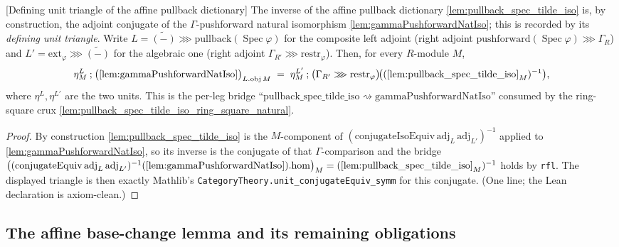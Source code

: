 \begin{lemma}


[Defining unit triangle of the affine pullback dictionary]
  \label{lem:pullback_spec_tilde_iso_inv_unit_triangle}
  The inverse of the affine pullback dictionary \cref{lem:pullback_spec_tilde_iso} is, by
  construction, the adjoint conjugate of the \(\Gamma\)-pushforward natural isomorphism
  \cref{lem:gammaPushforwardNatIso}; this is recorded by its \emph{defining unit triangle}.
  Write \(L = \widetilde{(-)} \ggg \mathrm{pullback}(\operatorname{Spec}\varphi)\) for the
  composite left adjoint (right adjoint \(\mathrm{pushforward}(\operatorname{Spec}\varphi)\ggg
  \Gamma_R\)) and \(L' = \mathrm{ext}_\varphi \ggg \widetilde{(-)}\) for the algebraic one
  (right adjoint \(\Gamma_{R'}\ggg\mathrm{restr}_\varphi\)). Then, for every \(R\)-module \(M\),
  \[
    \eta^{L}_M \mathbin{;} \bigl(\text{\cref{lem:gammaPushforwardNatIso}}\bigr)_{L.\mathrm{obj}\,M}
      \;=\;
    \eta^{L'}_M \mathbin{;} \bigl(\Gamma_{R'}\ggg\mathrm{restr}_\varphi\bigr)
              \!\bigl((\text{\cref{lem:pullback_spec_tilde_iso}}_M)^{-1}\bigr),
  \]
  where \(\eta^{L}, \eta^{L'}\) are the two units. This is the per-leg bridge
  ``\(\mathrm{pullback\_spec\_tilde\_iso}\rightsquigarrow\mathrm{gammaPushforwardNatIso}\)''
  consumed by the ring-square crux \cref{lem:pullback_spec_tilde_iso_ring_square_natural}.
  \begin{proof}
    By construction \cref{lem:pullback_spec_tilde_iso} is the \(M\)-component of
    \((\mathrm{conjugateIsoEquiv}\,\mathrm{adj}_L\,\mathrm{adj}_{L'})^{-1}\) applied to
    \cref{lem:gammaPushforwardNatIso}, so its inverse is the conjugate of that
    \(\Gamma\)-comparison and the bridge
    \(\bigl((\mathrm{conjugateEquiv}\,\mathrm{adj}_L\,\mathrm{adj}_{L'})^{-1}
    (\text{\cref{lem:gammaPushforwardNatIso}}).\mathrm{hom}\bigr)_M
    = (\text{\cref{lem:pullback_spec_tilde_iso}}_M)^{-1}\) holds by \texttt{rfl}. The displayed
    triangle is then exactly Mathlib's \texttt{CategoryTheory.unit\_conjugateEquiv\_symm} for this
    conjugate. (One line; the Lean declaration is axiom-clean.)
  \end{proof}
\end{lemma}

\subsection{The affine base-change lemma and its remaining obligations}

